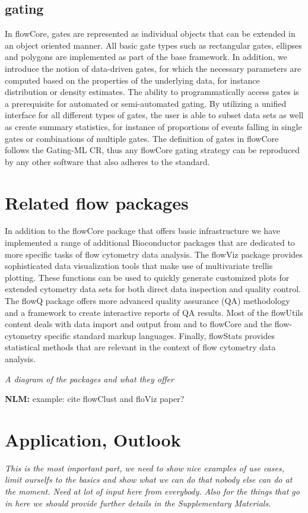 \documentclass[12pt]{article}
\begin{document}
\subsection{gating}
In flowCore, gates are represented as individual objects that can be
extended in an object oriented manner. All basic gate types such as
rectangular gates, ellipses and polygons are implemented as part of
the base framework. In addition, we introduce the notion of
data-driven gates, for which the necessary parameters are computed
based on the properties of the underlying data, for instance
distribution or density estimates. The ability to programmatically
access gates is a prerequisite for automated or semi-automated
gating. By utilizing a unified interface for all different types of
gates, the user is able to subset data sets as well as create summary
statistics, for instance of proportions of events falling in single
gates or combinations of multiple gates. The definition of gates in
flowCore follows the Gating-ML CR, thus any flowCore
gating strategy can be reproduced by any other software that also
adheres to the standard.

\section{Related flow packages}
In addition to the flowCore package that offers basic infrastructure
we have implemented a range of additional Bioconductor packages that
are dedicated to more specific tasks of flow cytometry data
analysis. The flowViz package provides sophisticated data
visualization tools that make use of multivariate trellis
plotting. These functions can be used to quickly generate customized
plots for extended cytometry data sets for both direct data inspection
and quality control. The flowQ package offers more advanced quality
assurance (QA) methodology and a framework to create interactive
reports of QA results. Most of the flowUtils content deals with data
import and output from and to flowCore and the flow-cytometry specific
standard markup languages. Finally, flowStats provides statistical
methods that are relevant in the context of flow cytometry data
analysis.

\textit{A diagram of the packages and what they offer}

{\bf NLM:} example: cite flowClust and floViz paper?

\section{Application, Outlook}
\textit{This is the most important part, we need to show nice examples
  of use cases, limit ourselfs to the basics and show what we can do
  that nobody else can do at the moment. Need at lot of input here
  from everybody. Also for the things that go in here we should
  provide further details in the Supplementary Materials.}
\end{document}
